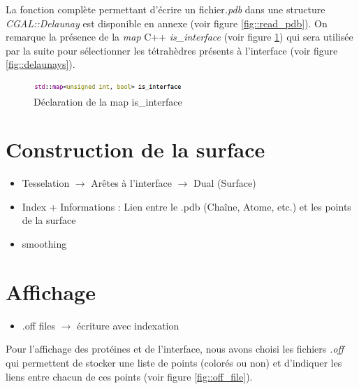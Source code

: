 La fonction complète permettant d'écrire un fichier\textit{.pdb} dans une structure
\textit{CGAL::Delaunay} est disponible en annexe (voir figure \ref{fig::read_pdb}).
On remarque la présence de la \textit{map} C++ \textit{is\_interface}
(voir figure \ref{fig::is_interface}) qui sera utilisée par la suite
pour sélectionner les tétrahèdres présents à l'interface (voir figure \ref{fig::delaunays}).

\begin{figure}[ht]
\centering
  \includegraphics[width=0.5\textwidth]{figures/is_interface.png}
  \caption{Déclaration de la map is\_interface}
  \label{fig::is_interface}
\end{figure}

\section{Construction de la surface}
\begin{itemize}
  \item Tesselation $\to$ Arêtes à l'interface $\to$ Dual (Surface)
  \item Index + Informations : Lien entre le .pdb (Chaîne, Atome, etc.) et les points de la surface
  \item smoothing
\end{itemize}



\section{Affichage}
\begin{itemize}
  \item .off files $\to$ écriture avec indexation
\end{itemize}

Pour l'affichage des protéines et de l'interface, nous avons choisi les fichiers
\textit{.off} qui permettent de stocker une liste de points (colorés ou non) et
d'indiquer les liens entre chacun de ces points (voir figure \ref{fig::off_file}).

